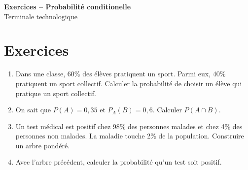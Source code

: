 \documentclass[french,11pt]{book}
\begin{document}
\begin{center}
{\Large \textbf{Exercices -- Probabilité conditionelle}}\\[2mm]
Terminale technologique
\end{center}

\section*{Exercices}
\begin{enumerate}
  \item Dans une classe, 60\% des élèves pratiquent un sport. Parmi eux, 40\% pratiquent un sport collectif. Calculer la probabilité de choisir un élève qui pratique un sport collectif.
  \item On sait que $P(A)=0,35$ et $P_A(B)=0,6$. Calculer $P(A\cap B)$.
  \item Un test médical est positif chez 98\% des personnes malades et chez 4\% des personnes non malades. La maladie touche 2\% de la population. Construire un arbre pondéré.
  \item Avec l'arbre précédent, calculer la probabilité qu'un test soit positif.
\end{enumerate}
\end{document}
